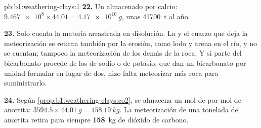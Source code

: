 \begin{solution}{pb:b1:weathering-clays:1}
\textbf{22.} Un  almacenado por calcio: $\num{9.467e8} \times 44.01 =
\qty{4.17e10}{g}$, unas \qty{41700}{t} al año.

\textbf{23.} Solo cuenta la materia arrastrada en disolución. La  y el cuarzo que deja la meteorización se retiran también por la erosión,
como lodo y arena en el río, y no se cuentan; tampoco la meteorización de los demás  de la roca. Y si parte del bicarbonato
procede de los  de sodio o de potasio, que dan un bicarbonato por unidad formular en lugar de dos, hizo falta meteorizar más roca para suministrarlo.

\textbf{24.} Según \cref{prop:b1:weathering-clays:co2}, se almacena un mol de  por mol de anortita: $3594.5 \times \qty{44.01}{g} = \qty{158.19}{kg}$.
La meteorización de una tonelada de anortita retira para siempre \textbf{158}~kg de dióxido de carbono.
\end{solution}

